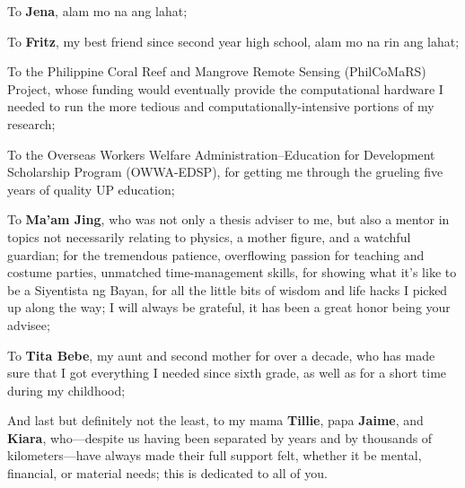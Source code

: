 To \textbf{Jena}, alam mo na ang lahat;

To \textbf{Fritz}, my best friend since second year high school, alam mo na rin ang lahat;

To the Philippine Coral Reef and Mangrove Remote Sensing (PhilCoMaRS) Project, whose funding would eventually provide the computational hardware I needed to run the more tedious and computationally-intensive portions of my research;

To the Overseas Workers Welfare Administration--Education for Development Scholarship Program (OWWA-EDSP), for getting me through the grueling five years of quality UP education;

To \textbf{Ma'am Jing}, who was not only a thesis adviser to me, but also a mentor in topics not necessarily relating to physics, a mother figure, and a watchful guardian; for the tremendous patience, overflowing passion for teaching and costume parties, unmatched time-management skills, for showing what it's like to be a Siyentista ng Bayan, for all the little bits of wisdom and life hacks I picked up along the way; I will always be grateful, it has been a great honor being your advisee;

To \textbf{Tita Bebe}, my aunt and second mother for over a decade, who has made sure that I got everything I needed since sixth grade, as well as for a short time during my childhood;

And last but definitely not the least, to my mama \textbf{Tillie}, papa \textbf{Jaime}, and \textbf{Kiara}, who---despite us having been separated by years and by thousands of kilometers---have always made their full support felt, whether it be mental, financial, or material needs; this is dedicated to all of you.